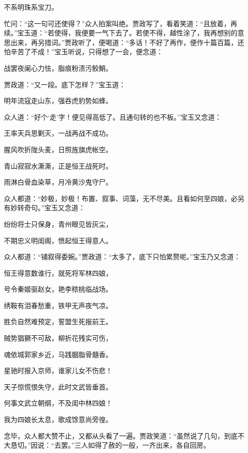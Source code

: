 不系明珠系宝刀。

忙问：``这一句可还使得？''众人拍案叫绝。贾政写了，看着笑道：``且放着，再续。''宝玉道：``若使得，我便要一气下去了。若使不得，越性涂了，我再想别的意思出来，再另措词。''贾政听了，便喝道：``多话！不好了再作，便作十篇百篇，还怕辛苦了不成！''宝玉听说，只得想了一会，便念道：

战罢夜阑心力怯，脂痕粉渍污鲛鮹。

贾政道：``又一段。底下怎样？''宝玉道：

明年流寇走山东，强吞虎豹势如蜂。

众人道：``好个`走'字！便见得高低了。且通句转的也不板。''宝玉又念道：

王率天兵思剿灭，一战再战不成功。

腥风吹折陇头麦，日照旌旗虎帐空。

青山寂寂水澌澌，正是恒王战死时。

雨淋白骨血染草，月冷黄沙鬼守尸。

众人都道：``妙极，妙极！布置、叙事、词藻，无不尽美。且看如何至四娘，必另有妙转奇句。''宝玉又念道：

纷纷将士只保身，青州眼见皆灰尘，

不期忠义明闺阁，愤起恒王得意人。

众人都道：``铺叙得委婉。''贾政道：``太多了，底下只怕累赘呢。''宝玉乃又念道：

恒王得意数谁行，就死将军林四娘，

号令秦姬驱赵女，艳李秾桃临战场。

绣鞍有泪春愁重，铁甲无声夜气凉。

胜负自然难预定，誓盟生死报前王。

贼势猖獗不可敌，柳折花残实可伤，

魂依城郭家乡近，马践胭脂骨髓香。

星驰时报入京师，谁家儿女不伤悲！

天子惊慌恨失守，此时文武皆垂首。

何事文武立朝纲，不及闺中林四娘！

我为四娘长太息，歌成馀意尚旁徨。

念毕，众人都大赞不止，又都从头看了一遍。贾政笑道：``虽然说了几句，到底不大恳切。''因说：``去罢。''三人如得了赦的一般，一齐出来，各自回房。

